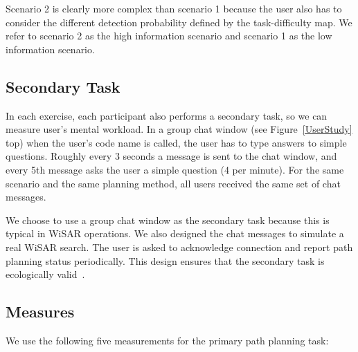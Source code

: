 Scenario 2 is clearly more complex than scenario 1 because the user also has to consider the different detection probability defined by the task-difficulty map. We refer to scenario 2 as the high information scenario and scenario 1 as the low information scenario.

\subsection{Secondary Task}

In each exercise, each participant also performs a secondary task, so we can measure user's mental workload. In a group chat window (see Figure~\ref{UserStudy} top) when the user's code name is called, the user has to type answers to simple questions. Roughly every 3 seconds a message is sent to the chat window, and every 5th message asks the user a simple question (4 per minute). For the same scenario and the same planning method, all users received the same set of chat messages.

We choose to use a group chat window as the secondary task because this is typical in WiSAR operations. We also designed the chat messages to simulate a real WiSAR search. The user is asked to acknowledge connection and report path planning status periodically. This design ensures that the secondary task is ecologically valid~\cite{Vicente1997Should,Rasmussen1994Cognitive}.

\subsection{Measures}

We use the following five measurements for the primary path planning task:

